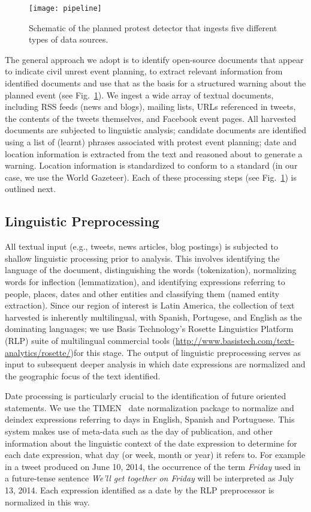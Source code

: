\begin{figure}
\texttt{[image: pipeline]}
\vspace{-2em}
\caption{Schematic of the planned protest detector that ingests five
different types of data sources.}
\label{flowchart}
\end{figure}
The general approach we adopt is to identify open-source documents
that appear to indicate civil unrest event planning, to extract
relevant information from identified documents and use that as the
basis for a structured warning about the planned event (see Fig.~\ref{flowchart}).
We ingest a
wide array of textual documents, including RSS feeds (news and blogs),
mailing lists, URLs referenced in tweets, the contents of the tweets themselves,
and Facebook event pages.
All harvested documents are subjected to linguistic analysis; candidate
documents are identified using a list of (learnt) phrases associated with
protest event planning; date and location information is extracted from the
text and reasoned about to generate a warning. Location information is standardized
to conform to a standard (in our case, we use the World Gazeteer).
Each of these processing
steps (see Fig.~\ref{flowchart}) is outlined next.

\vspace{-0.5em}
\subsection{Linguistic Preprocessing}
All textual input (e.g., tweets, news articles, blog postings) is
subjected to shallow linguistic processing prior to analysis.  This
involves identifying the language of the document, distinguishing
the words (tokenization), normalizing words for inflection
(lemmatization), and identifying expressions referring to people,
places, dates and other entities and classifying them (named entity extraction). 
Since our region of interest is Latin America, the collection of text
harvested is inherently multilingual, with Spanish, Portugese, and English as
the dominating languages;
we use Basis Technology's Rosette Linguistics Platform (RLP) suite of multilingual commercial tools (\url{http://www.basistech.com/text-analytics/rosette/})for this stage.
The output of linguistic preprocessing serves as input to subsequent deeper analysis in which 
date expressions are normalized and the geographic focus of the text identified.

Date processing is particularly crucial to the identification of
future oriented statements. We use the TIMEN~\cite{LlorensDGS12} date
normalization package to normalize and deindex expressions referring
to days in English, Spanish and Portuguese. This system makes use of
meta-data such as the day of publication, and other information about
the linguistic context of the date expression to determine for each
date expression, what day (or week, month or year) it refers to.  For
example in a tweet produced on June 10, 2014, the occurrence of the
term {\em Friday} used in a future-tense sentence {\em We'll get
  together on Friday} will be interpreted as July 13, 2014.  Each
expression identified as a date by the RLP preprocessor is normalized
in this way.

